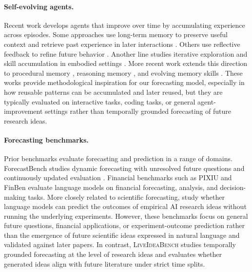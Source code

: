 \documentclass{article} %
\begin{document}
\paragraph{Self-evolving agents.}
Recent work develops agents that improve over time by accumulating experience across episodes. Some approaches use long-term memory to preserve useful context and retrieve past experience in later interactions \citep{zhong2023memorybank,packer2024memgpt}. Others use reflective feedback to refine future behavior \citep{shinn2023reflexion}. Another line studies iterative exploration and skill accumulation in embodied settings \citep{wang2023voyager}. More recent work extends this direction to procedural memory \citep{cao2025reme}, reasoning memory \citep{ouyang2025reasoningbank}, and evolving memory skills \citep{zhang2026memskill,zhang2025memgen}. These works provide methodological inspiration for our forecasting model, especially in how reusable patterns can be accumulated and later reused, but they are typically evaluated on interactive tasks, coding tasks, or general agent-improvement settings rather than temporally grounded forecasting of future research ideas.

\vspace{-2mm}
\paragraph{Forecasting benchmarks.}
Prior benchmarks evaluate forecasting and prediction in a range of domains. ForecastBench studies dynamic forecasting with unresolved future questions and continuously updated evaluation \citep{karger2024forecastbench}. Financial benchmarks such as PIXIU \citep{xie2023pixiu} and FinBen \citep{xie2024finben} evaluate language models on financial forecasting, analysis, and decision-making tasks. More closely related to scientific forecasting, \citet{wen2025predicting} study whether language models can predict the outcomes of empirical {AI} research ideas without running the underlying experiments. However, these benchmarks focus on general future questions, financial applications, or experiment-outcome prediction rather than the emergence of future scientific ideas expressed in natural language and validated against later papers. In contrast, \textsc{LiveIdeaBench} studies temporally grounded forecasting at the level of research ideas and evaluates whether generated ideas align with future literature under strict time splits.

\end{document}
